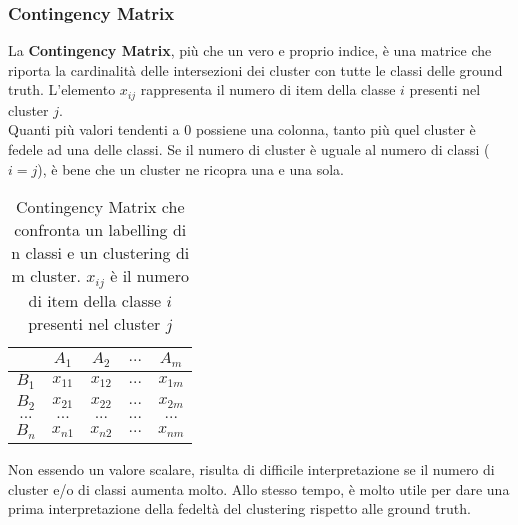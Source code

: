 \subsubsection{Contingency Matrix}
La \textbf{Contingency Matrix}, più che un vero e proprio indice, è una matrice che riporta la cardinalità delle intersezioni dei cluster con tutte le classi delle ground truth. L'elemento $x_{ij}$ rappresenta il numero di item della classe $i$ presenti nel cluster $j$.\\
Quanti più valori tendenti a 0 possiene una colonna, tanto più quel cluster è fedele ad una delle classi. Se il numero di cluster è uguale al numero di classi ($i=j$), è bene che un cluster ne ricopra una e una sola.\\
\begin{table}[H]
	\centering
	\begin{tabular}{c | c c c c}
		& $A_1$ & $A_2$ & $...$ & $A_m$\\
		\hline
		$B_1$ & $x_{11}$ & $x_{12}$ & $...$ & $x_{1m}$\\
		$B_2$& $x_{21}$ & $x_{22}$ & $...$ & $x_{2m}$\\
		$...$ & $...$ & $...$ & $...$ & $...$\\
		$B_n$& $x_{n1}$ & $x_{n2}$ & $...$ & $x_{nm}$
	\end{tabular}
	\caption{Contingency Matrix che confronta un labelling di n classi e un clustering di m cluster. $x_{ij}$ è il numero di item della classe $i$ presenti nel cluster $j$}
	\label{tab:contingency}
\end{table} 
Non essendo un valore scalare, risulta di difficile interpretazione se il numero di cluster e/o di classi aumenta molto. Allo stesso tempo, è molto utile per dare una prima interpretazione della fedeltà del clustering rispetto alle ground truth.

